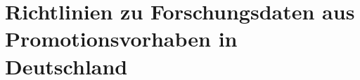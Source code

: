 \chapter{Richtlinien zu Forschungsdaten aus Promotionsvorhaben in Deutschland}\label{ch:richtlinien}
